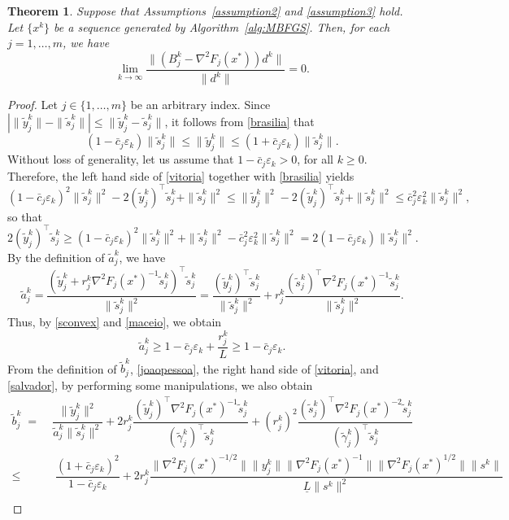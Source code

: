 \documentclass[11pt]{article}
\newtheorem{theorem}{Theorem}[section]
\numberwithin{assumption}{section}
\newcommand{\xs}{x^{\ast}}
\newcommand{\ty}{\tilde{y}_j^k}
\newcommand{\ts}{\tilde{s}_j^k}
\newcommand{\ta}{\tilde{a}_j^k}
\newcommand{\tb}{\tilde{b}_j^k}
\newcommand{\tg}{\tilde{\gamma}_j^k}
\begin{document}
\begin{theorem} \label{teo:saoluis}
Suppose that Assumptions~\ref{assumption2} and \ref{assumption3} hold. Let $\{x^k\}$ be a sequence generated by Algorithm~\ref{alg:MBFGS}. Then, for each $j=1,\ldots,m$, we have
 \begin{equation}\label{aracaju}
 \lim_{k \to\infty}\dfrac{\| (B_j^k - \nabla ^2F_j(\xs))d^k\|}{\|d^k\|} = 0.
  \end{equation}
\end{theorem}
\begin{proof}
 Let $j\in\{1,\ldots, m\}$ be an arbitrary index. Since $|\|\ty\|-\|\ts\||\leq\|\ty-\ts\|$, it follows from \eqref{brasilia} that
 \begin{equation}\label{vitoria}
 (1-\bar{c}_j\varepsilon_k)\|\ts\|\leq \|\ty\| \leq  (1+\bar{c}_j\varepsilon_k)\|\ts\|.
 \end{equation}
Without loss of generality, let us assume that $1-\bar{c}_j\varepsilon_k>0$, for all $k\geq 0$.
Therefore, the left hand side of \eqref{vitoria} together with \eqref{brasilia} yields
$$ (1-\bar{c}_j\varepsilon_k)^2\|\ts\|^2-2(\ty)^\top\ts+\|\ts\|^2 \leq \|\ty\|^2 -2(\ty)^\top\ts+\|\ts\|^2 \leq \bar{c}_j^2 \varepsilon_k^2 \|\ts\|^2,$$
so that
 \begin{equation}\label{maceio} 
 2(\ty)^\top\ts\geq (1-\bar{c}_j\varepsilon_k)^2\|\ts\|^2+\|\ts\|^2-\bar{c}_j^2 \varepsilon_k^2 \|\ts\|^2=2(1-\bar{c}_j\varepsilon_k) \|\ts\|^2.
  \end{equation}
By the definition of $\ta$, we have
\[\ta=\dfrac{(\ty+r_j^k \nabla^2F_j(x^{*})^{-1}\ts)^\top\ts}{\|\ts\|^2}=\dfrac{(\ty)^\top\ts}{\|\ts\|^2}+r_j^k\dfrac{(\ts)^\top\nabla^2F_j(x^{*})^{-1}\ts}{\|\ts\|^2}.\]
 Thus, by \eqref{sconvex} and \eqref{maceio}, we obtain
 \begin{equation}\label{salvador} 
\ta\geq 1-\bar{c}_j\varepsilon_k + \dfrac{r_j^k}{L}\geq 1-\bar{c}_j\varepsilon_k.
  \end{equation}
From the definition of $\tb$, \eqref{joaopessoa}, the right hand side of \eqref{vitoria}, and \eqref{salvador}, by performing some manipulations, we also obtain 
  \begin{align}
 \tb \; = \;&  \dfrac{\|\ty\|^2}{\ta\|\ts\|^2}+2r_j^k\dfrac{(\ty)^\top\nabla^2F_j(x^{*})^{-1}\ts}{(\tg)^\top\ts}+(r_j^k)^2\dfrac{(\ts)^\top\nabla^2F_j(x^{*})^{-2}\ts}{(\tg)^\top\ts} \nonumber \\
  \leq & \; \dfrac{(1+\bar{c}_j\varepsilon_k)^2}{1-\bar{c}_j\varepsilon_k} + 2r_j^k\dfrac{\|\nabla^2F_j(x^{*})^{-1/2}\|\|y_j^{k}\| \|\nabla^2F_j(x^{*})^{-1}\| \|\nabla^2F_j(x^{*})^{1/2}\| \|s^k\|}{\underline{L}\|s^k\|^2} \nonumber\\

\end{align}
\end{proof}
\end{document}
